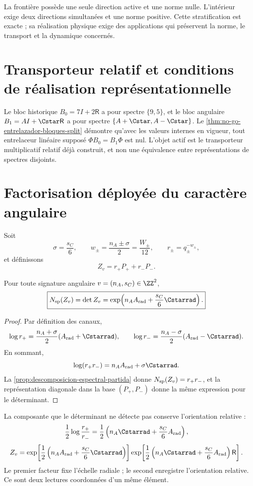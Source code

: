 La frontière possède une seule direction active et une norme nulle. L'intérieur exige deux directions simultanées et une norme positive. Cette stratification est exacte ; sa réalisation physique exige des applications qui préservent la norme, le transport et la dynamique concernés.

\section{Transporteur relatif et conditions de réalisation représentationnelle}
\label{sec:transportador-relativo-split-md}

Le bloc historique \(B_0=7I+2\mathsf R\) a pour spectre \(\{9,5\}\), et le bloc angulaire \(B_1=AI+\Cstar\mathsf R\) a pour spectre \(\{A+\Cstar,A-\Cstar\}\). Le \cref{thm:no-go-entrelazador-bloques-split} démontre qu'avec les valeurs internes en vigueur, tout entrelaceur linéaire supposé \(\Phi B_0=B_1\Phi\) est nul. L'objet actif est le transporteur multiplicatif relatif déjà construit, et non une équivalence entre représentations de spectres disjoints.

\section{Factorisation déployée du caractère angulaire}
\label{sec:factorizacion-split-angular}

Soit
\[
 \sigma=\frac{s_C}{6},\qquad
 w_\pm=\frac{n_A\pm\sigma}{2}=\frac{W_\pm}{12},
 \qquad
 r_\pm=q_\pm^{-w_\pm},
\]
et définissons
\[
 Z_v=r_+P_++r_-P_-.
\]

\begin{theorem}
\label{thm:split-character} Pour toute signature angulaire \(v=(n_A,s_C)\in\ZZ^2\),
\[
 \boxed{
 N_{\rm sp}(Z_v)
 =\det Z_v
 =\exp\!\left(
 n_AA_{\rm rad}+\frac{s_C}{6}\Cstarrad
 \right).}
\]
\end{theorem}

\begin{proof}
Par définition des canaux,
\[
 \log r_+
 =\frac{n_A+\sigma}{2}(A_{\rm rad}+\Cstarrad),
 \qquad
 \log r_-
 =\frac{n_A-\sigma}{2}(A_{\rm rad}-\Cstarrad).
\]
En sommant,
\[
 \log(r_+r_-)
 =n_AA_{\rm rad}+\sigma\Cstarrad.
\]
La \cref{prop:descomposicion-espectral-partida} donne \(N_{\rm sp}(Z_v)=r_+r_-\), et la représentation diagonale dans la base \((P_+,P_-)\) donne la même expression pour le déterminant.
\end{proof}

La composante que le déterminant ne détecte pas conserve l'orientation relative :
\[
 \frac12\log\frac{r_+}{r_-}
 =\frac12\left(
 n_A\Cstarrad+\frac{s_C}{6}A_{\rm rad}
 \right),
\]
\[
 Z_v=
 \exp\!\left[
 \frac12\left(n_AA_{\rm rad}+\frac{s_C}{6}\Cstarrad\right)
 \right]
 \exp\!\left[
 \frac12\left(n_A\Cstarrad+\frac{s_C}{6}A_{\rm rad}\right)
 \mathsf R
 \right].
\]
Le premier facteur fixe l'échelle radiale ; le second enregistre l'orientation relative. Ce sont deux lectures coordonnées d'un même élément.

